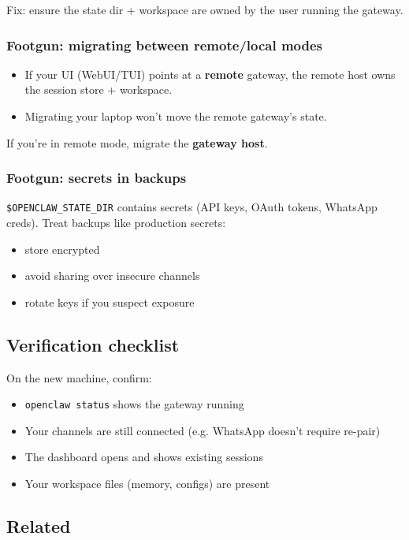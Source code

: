 Fix: ensure the state dir + workspace are owned by the user running the gateway.

\subsubsection{Footgun: migrating between remote/local modes}


\begin{itemize}
  \item If your UI (WebUI/TUI) points at a \textbf{remote} gateway, the remote host owns the session store + workspace.
  \item Migrating your laptop won’t move the remote gateway’s state.
\end{itemize}


If you’re in remote mode, migrate the \textbf{gateway host}.

\subsubsection{Footgun: secrets in backups}


\texttt{\$OPENCLAW\_STATE\_DIR} contains secrets (API keys, OAuth tokens, WhatsApp creds). Treat backups like production secrets:

\begin{itemize}
  \item store encrypted
  \item avoid sharing over insecure channels
  \item rotate keys if you suspect exposure
\end{itemize}


\subsection{Verification checklist}


On the new machine, confirm:

\begin{itemize}
  \item \texttt{openclaw status} shows the gateway running
  \item Your channels are still connected (e.g. WhatsApp doesn’t require re-pair)
  \item The dashboard opens and shows existing sessions
  \item Your workspace files (memory, configs) are present
\end{itemize}


\subsection{Related}


